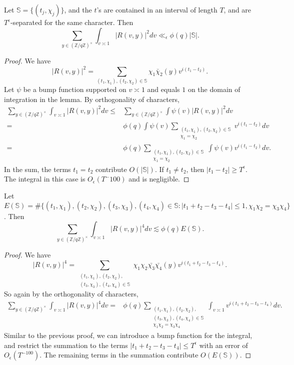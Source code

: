\begin{lemma} \label{secondmoment}
    Let $\mathbb{S}=\{(t_j,\chi_j)\}$, and the $t$'s are contained in an interval of length $T$, and are $T^\epsilon$-separated for the same character. Then \[
        \sum_{y\in (\mathbb{Z}/q\mathbb{Z})^\times} \int_{v\asymp 1} 
        \left|R\left(v,y\right)\right|^2dv \ll_{\epsilon} \phi(q)|\mathbb{S}|.
    \]
\end{lemma}
\begin{proof}
    We have \[
    |R(v,y)|^2 = \sum_{(t_1,\chi_1),(t_2,\chi_2)\in \mathbb{S}}
    \chi_1\bar{\chi}_2(y)v^{i(t_1-t_2)}.
    \]
    Let $\psi$ be a bump function supported on $v\asymp 1$ and equals $1$ on the domain of integration in the lemma.
    By orthogonality of characters, \begin{align*}
        \sum_{y\in (\mathbb{Z}/q\mathbb{Z})^\times} \int_{v\asymp 1} 
        \left|R\left(v,y\right)\right|^2dv 
        \leq&\sum_{y\in (\mathbb{Z}/q\mathbb{Z})^\times} \int 
        \psi(v)\left|R\left(v,y\right)\right|^2dv 
        \\=&
        \phi(q)\int \psi(v)
        \sum_{\substack{(t_1,\chi_1),(t_2,\chi_2)\in \mathbb{S}\\ \chi_1=\chi_2}}v^{i(t_1-t_2)}
        dv\\
        =&
        \phi(q)\sum_{\substack{(t_1,\chi_1),(t_2,\chi_2)\in \mathbb{S}\\ \chi_1=\chi_2}}\int \psi(v)
        v^{i(t_1-t_2)}
        dv.
    \end{align*}
    In the sum, the terms $t_1=t_2$ contribute $O(|\mathbb{S}|)$. If $t_1\neq t_2$, then $|t_1-t_2|\geq T^\epsilon$. The integral in this case is $O_\epsilon(T^-100)$ and is negligible.
\end{proof}
\begin{lemma}\label{fourthmoment}
    Let $E(\mathbb{S})=\#\{(t_1,\chi_1),(t_2,\chi_2),(t_3,\chi_3),(t_4,\chi_4)\in \mathbb{S}  :  |t_1+t_2-t_3-t_4|\leq 1, \chi_1\chi_2=\chi_3\chi_4\}$. Then \[
        \sum_{y\in (\mathbb{Z}/q\mathbb{Z})^\times} \int_{v\asymp 1} 
        \left|R\left(v,y\right)\right|^4dv  \lesssim \phi(q)E(\mathbb{S}).
    \]
\end{lemma}
\begin{proof}
    We have \[
    |R(v,y)|^4 = \sum_{\substack{(t_1,\chi_1),(t_2,\chi_2),\\ (t_3,\chi_3),(t_4,\chi_4)\in \mathbb{S}}}
    \chi_1{\chi}_2\bar{\chi_3}\bar{\chi_4}(y)v^{i(t_1+t_2-t_3-t_4)}.
    \]
    So again by the orthogonality of characters, \begin{align*}
        \sum_{y\in (\mathbb{Z}/q\mathbb{Z})^\times} \int_{v\asymp 1} 
        \left|R\left(v,y\right)\right|^4dv = & \phi(q)
        \sum_{\substack{(t_1,\chi_1),(t_2,\chi_2),\\ (t_3,\chi_3),(t_4,\chi_4)\in \mathbb{S}\\ \chi_1\chi_2=\chi_3\chi_4}} \int_{v\asymp 1} v^{i(t_1+t_2-t_3-t_4)} dv.
    \end{align*}
    Similar to the previous proof, we can introduce a bump function for the integral, and restrict the summation to the terms $|t_1+t_2-t_3-t_4|\leq T^\epsilon$ with an error of $O_\epsilon(T^{-100})$. The remaining terms in the summation contribute $O(E(\mathbb{S}))$.
\end{proof}

